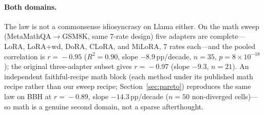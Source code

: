 \documentclass[11pt]{article}
\begin{document}
\paragraph{Both domains.} The law is not a commonsense idiosyncrasy on Llama
either. On the math sweep (MetaMathQA$\rightarrow$GSM8K, same 7-rate design)
five adapters are complete---LoRA, LoRA{+}wd, DoRA, CLoRA, and MiLoRA, 7 rates
each---and the pooled correlation is $r\!=\!-0.95$ ($R^2\!=\!0.90$, slope
$-8.9$\,pp/decade, $n\!=\!35$, $p\!=\!8\!\times\!10^{-18}$); the original
three-adapter subset gives $r\!=\!-0.97$ (slope $-9.3$, $n\!=\!21$). An
independent faithful-recipe math block (each method under its published math
recipe rather than our sweep recipe; Section~\ref{sec:pareto}) reproduces the
same law on BBH at $r\!=\!-0.89$, slope $-14.3$\,pp/decade ($n\!=\!50$
non-diverged cells)---so math is a genuine second domain, not a sparse
afterthought.
\end{document}
